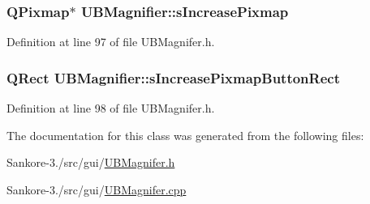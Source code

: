 \hypertarget{class_u_b_magnifier_a73e5c26959cfa81a511c804333e227b6}{
\subsubsection[{s\-Increase\-Pixmap}]{\setlength{\rightskip}{0pt plus 5cm}Q\-Pixmap$\ast$ U\-B\-Magnifier\-::s\-Increase\-Pixmap\hspace{0.3cm}{\ttfamily [protected]}}}\label{d4/d9d/class_u_b_magnifier_a73e5c26959cfa81a511c804333e227b6}


Definition at line 97 of file U\-B\-Magnifer.\-h.

\hypertarget{class_u_b_magnifier_a6bdcd5e3d40af5c2ee1c2009ada214dd}{
\subsubsection[{s\-Increase\-Pixmap\-Button\-Rect}]{\setlength{\rightskip}{0pt plus 5cm}Q\-Rect U\-B\-Magnifier\-::s\-Increase\-Pixmap\-Button\-Rect\hspace{0.3cm}{\ttfamily [protected]}}}\label{d4/d9d/class_u_b_magnifier_a6bdcd5e3d40af5c2ee1c2009ada214dd}


Definition at line 98 of file U\-B\-Magnifer.\-h.



The documentation for this class was generated from the following files\-:\begin{DoxyCompactItemize}
\item 
Sankore-\/3./src/gui/\hyperlink{_u_b_magnifer_8h}{U\-B\-Magnifer.\-h}\item 
Sankore-\/3./src/gui/\hyperlink{_u_b_magnifer_8cpp}{U\-B\-Magnifer.\-cpp}\end{DoxyCompactItemize}
